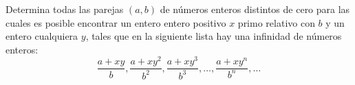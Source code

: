 Determina todas las parejas $(a,b)$ de números enteros distintos de cero para las cuales es posible encontrar un entero entero positivo $x$ primo relativo con $b$ y un entero cualquiera $y$, tales que en la siguiente lista hay una infinidad de números enteros:
\[\frac{a+xy}{b},\frac{a+xy^2}{b^2},\frac{a+xy^3}{b^3},\dots,\frac{a+xy^n}{b^n},\dots\]